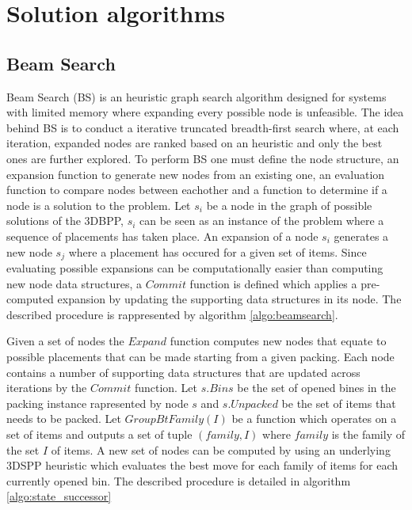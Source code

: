\chapter{Solution algorithms}\label{chapter:heuristics}
\section{Beam Search}\label{chapter:heuristics:beamsearch}
Beam Search (BS) %
is an heuristic graph search algorithm designed for systems with limited memory where expanding every possible node is unfeasible.
The idea behind BS is to conduct a iterative truncated breadth-first search where, at each iteration, expanded nodes are ranked based on an heuristic and only the best ones are further explored.
To perform BS one must define the node structure, an expansion function to generate new nodes from an existing one, an evaluation function to compare nodes between eachother and a function to determine if a node is a solution to the problem.
Let $s_i$ be a node in the graph of possible solutions of the 3DBPP, %
$s_i$ can be seen as an instance of the problem where a sequence of placements has taken place.
An expansion of a node $s_i$ generates a new node $s_j$ where a placement has occured for a given set of items.
Since evaluating possible expansions can be computationally easier than computing new node data structures, %
a $Commit$ function is defined which applies a pre-computed expansion by updating the supporting data structures in its node.
The described procedure is rappresented by algorithm \ref{algo:beamsearch}.



Given a set of nodes the $Expand$ function computes new nodes that equate to possible placements that can be made starting from a given packing.
Each node contains a number of supporting data structures that are updated across iterations by the $Commit$ function.
Let $s.Bins$ be the set of opened bines in the packing instance rapresented by node $s$ and $s.Unpacked$ be the set of items that needs to be packed.
Let $GroupBtFamily(I)$ be a function which operates on a set of items and outputs a set of tuple $(family, I)$ where $family$ is the family of the set $I$ of items. %
A new set of nodes can be computed by using an underlying 3DSPP heuristic which evaluates the best move for each family of items for each currently opened bin.
The described procedure is detailed in algorithm \ref{algo:state_successor}  

